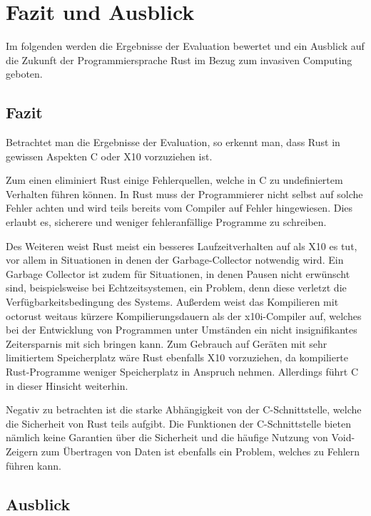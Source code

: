 \chapter{Fazit und Ausblick}\label{sec:conclusion}

Im folgenden werden die Ergebnisse der Evaluation bewertet und ein Ausblick auf die Zukunft der Programmiersprache Rust
im Bezug zum invasiven Computing geboten.

\section{Fazit}

Betrachtet man die Ergebnisse der Evaluation, so erkennt man, dass Rust in gewissen Aspekten C oder X10 vorzuziehen ist.

Zum einen eliminiert Rust einige Fehlerquellen, welche in C zu undefiniertem Verhalten führen können. In Rust muss der
Programmierer nicht selbst auf solche Fehler achten und wird teils bereits vom Compiler auf Fehler hingewiesen.
Dies erlaubt es, sicherere und weniger fehleranfällige Programme zu schreiben.

Des Weiteren weist Rust meist ein besseres Laufzeitverhalten auf als X10 es tut, vor allem in Situationen
in denen der Garbage-Collector notwendig wird. Ein Garbage Collector ist zudem für Situationen, in denen Pausen nicht
erwünscht sind, beispielsweise bei Echtzeitsystemen, ein Problem, denn diese verletzt die Verfügbarkeitsbedingung des Systems.
Außerdem weist das Kompilieren mit octorust weitaus kürzere Kompilierungsdauern als der x10i-Compiler auf, welches bei
der Entwicklung von Programmen unter Umständen ein nicht insignifikantes Zeitersparnis mit sich bringen kann. Zum Gebrauch auf
Geräten mit sehr limitiertem Speicherplatz wäre Rust ebenfalls X10 vorzuziehen, da kompilierte Rust-Programme weniger Speicherplatz
in Anspruch nehmen. Allerdings führt C in dieser Hinsicht weiterhin.

Negativ zu betrachten ist die starke Abhängigkeit von der C-Schnittstelle, welche die Sicherheit von Rust teils aufgibt.
Die Funktionen der C-Schnittstelle bieten nämlich keine Garantien über die Sicherheit und die häufige Nutzung von
Void-Zeigern zum Übertragen von Daten ist ebenfalls ein Problem, welches zu Fehlern führen kann.

\section{Ausblick}

